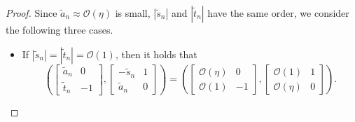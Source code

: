 \documentclass[11pt]{article}
\numberwithin{equation}{section}
\begin{document}
\begin{proof}
Since $\widetilde{a}_n \approx \mathcal{O}(\eta)$ is small, $|\widetilde{s}_n|$ and $|\widetilde{t}_n|$ have the same order,
we consider the following three cases.

\begin{itemize}
    \item[(i)]If $|\widetilde{s}_n| = |\widetilde{t}_n| = \mathcal{O}(1)$, then it holds that
    \begin{equation} \label{eq: order approx}
    \left(
    \begin{bmatrix}
    \widetilde{a}_n & 0 \\
    \widetilde{t}_n & -1
    \end{bmatrix},
    \begin{bmatrix}
    -\widetilde{s}_n & 1 \\
    \widetilde{a}_n & 0
    \end{bmatrix}
    \right)
    =
    \left(
    \begin{bmatrix}
    \mathcal{O}(\eta) & 0 \\
    \mathcal{O}(1) & -1
    \end{bmatrix},
    \begin{bmatrix}
    \mathcal{O}(1) & 1 \\
    \mathcal{O}(\eta) & 0
    \end{bmatrix}
    \right).
    \end{equation}


\end{itemize}
\end{proof}
\end{document}
